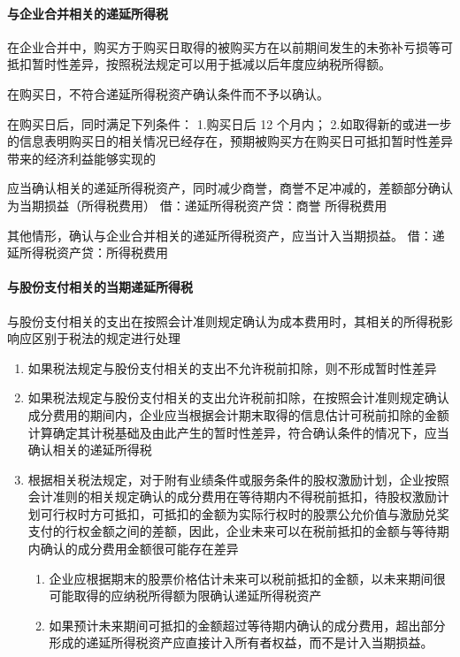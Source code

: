 \documentclass[UTF8,12pt]{ctexart}
\numberwithin{equation}{section} %
\numberwithin{figure}{section}
\numberwithin{table}{section}
\begin{document}
	\paragraph{与企业合并相关的递延所得税}
	在企业合并中，购买方于购买日取得的被购买方在以前期间发生的未弥补亏损等可抵扣暂时性差异，按照税法规定可以用于抵减以后年度应纳税所得额。
	
	在购买日，不符合递延所得税资产确认条件而不予以确认。
	
	在购买日后，同时满足下列条件：
	1.购买日后 12 个月内；
	2.如取得新的或进一步的信息表明购买日的相关情况已经存在，预期被购买方在购买日可抵扣暂时性差异带来的经济利益能够实现的
	
	应当确认相关的递延所得税资产，同时减少商誉，商誉不足冲减的，差额部分确认为当期损益（所得税费用）
	借：递延所得税资产贷：商誉
	所得税费用
	
	其他情形，确认与企业合并相关的递延所得税资产，应当计入当期损益。
	借：递延所得税资产贷：所得税费用
	
	
	\paragraph{与股份支付相关的当期递延所得税}
	与股份支付相关的支出在按照会计准则规定确认为成本费用时，其相关的所得税影响应区别于税法的规定进行处理
	\begin{enumerate}
		\item 如果税法规定与股份支付相关的支出不允许税前扣除，则不形成暂时性差异
		
		\item 如果税法规定与股份支付相关的支出允许税前扣除，在按照会计准则规定确认成分费用的期间内，企业应当根据会计期末取得的信息估计可税前扣除的金额计算确定其计税基础及由此产生的暂时性差异，符合确认条件的情况下，应当确认相关的递延所得税
		
		\item 根据相关税法规定，对于附有业绩条件或服务条件的股权激励计划，企业按照会计准则的相关规定确认的成分费用在等待期内不得税前抵扣，待股权激励计划可行权时方可抵扣，可抵扣的金额为实际行权时的股票公允价值与激励兑奖支付的行权金额之间的差额，因此，企业未来可以在税前抵扣的金额与等待期内确认的成分费用金额很可能存在差异
		\begin{enumerate}
			\item 企业应根据期末的股票价格估计未来可以税前抵扣的金额，以未来期间很可能取得的应纳税所得额为限确认递延所得税资产
			
			\item 如果预计未来期间可抵扣的金额超过等待期内确认的成分费用，超出部分形成的递延所得税资产应直接计入所有者权益，而不是计入当期损益。
		\end{enumerate}
	\end{enumerate}
	
\end{document}
